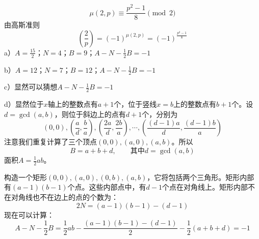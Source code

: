 \[\mu(2,p)\equiv \frac{p^2-1}{8}\pmod2\]
由高斯准则
\[\left(\frac{2}{p}\right)=(-1)^{\mu(2, p)}=(-1)^{\frac{p^2-1}{8}}\]
%
\exercise a）$A=\frac{15}{2}$；$N=4$；$B=9$；$A-N-\frac{1}{2}B=-1$\par
b）$A=12$；$N=7$；$B=12$；$A-N-\frac{1}{2}B=-1$\par
c）显然可以猜想$A-N-\frac{1}{2}B=-1$\par
d）\proof 显然位于$x$轴上的整数点有$a+1$个，位于竖线$x=b$上的整数点有$b+1$个。设$d=\gcd(a,b)$，则位于斜边上的点有$d+1$个，分别为
\[(0,0),\left(\frac{a}{d}, \frac{b}{a}\right),\left(\frac{2a}{d}, \frac{2b}{a}\right),\cdots,\left(\frac{(d-1)a}{d}, \frac{(d-1)b}{a}\right)\]
注意我们重复计算了三个顶点$(0,0),(a,0),(a,b)$。所以
\[B=a+b+d,\qquad \text{其中}d=\gcd(a,b)\]
面积$A=\frac{1}{2}ab$。\par
构造一个矩形$(0, 0),(a,0),(0,b),(a,b)$，它将包括两个三角形。矩形内部有$(a-1)(b-1)$个点。这些内部点中，有$d-1$个点在对角线上。矩形内部不在对角线也不在边上的点的个数为：
\[2N=(a-1)(b-1)-(d-1)\]
现在可以计算：
\[A-N-\frac{1}{2}B=\frac{1}{2}ab-\frac{(a-1)(b-1)-(d-1)}{2}-\frac{1}{2}(a+b+d)=-1\]